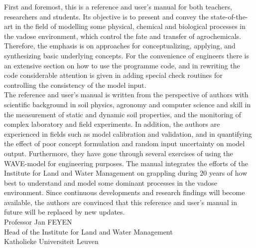 First and foremost, this is a reference and user's manual for both teachers, researchers and students. Its objective is to present and convey the state-of-the-art in the field of modelling some physical, chemical and biological processes in the vadose environment, which control the fate and transfer of agrochemicals. Therefore, the emphasis is on approaches for conceptualizing, applying, and synthesizing basic underlying concepts. For the convenience of engineers there is an extensive section on how to use the programme code, and in rewriting the code considerable attention is given in adding special check routines for controlling the consistency of the model input.\\

The reference and user's manual is written from the perspective of authors with scientific background in soil physics, agronomy and computer science and skill in the measurement of static and dynamic soil properties, and the monitoring of complex laboratory and field experiments. In addition, the authors are experienced in fields such as model calibration and validation, and in quantifying the effect of poor concept formulation and random input uncertainty on model output. Furthermore, they have gone through several exercises of using the WAVE-model for engineering purposes. The manual integrates the efforts of the Institute for Land and Water Management on grappling during 20 years of how best to understand and model some dominant processes in the vadose environment. Since continuous developments and research findings will become available, the authors are convinced that this reference and user's manual in future will be replaced by new updates.\\


Professor Jan FEYEN\\
Head of the Institute for Land and Water Management\\
Katholieke Universiteit Leuven